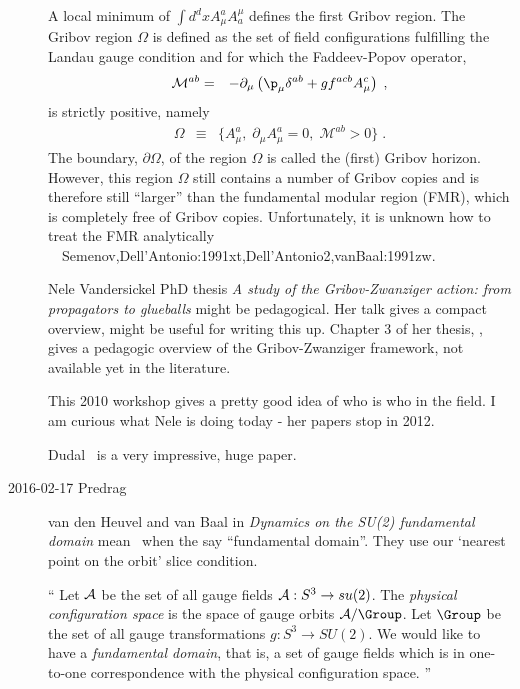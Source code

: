 \begin{description}
A local minimum of $\int d^dx A_\mu^a A^\mu_a$
defines the first Gribov region.
The Gribov region $\Omega$ is  defined as the set of
field configurations fulfilling the Landau gauge condition and for
which the Faddeev-Popov operator,
\begin{eqnarray}
\mathcal{M}^{ab} &=&  -\partial_{\mu}\left( \p_{\mu} \delta^{ab}
    + g f^{acb} A^c_{\mu} \right) \;,
\end{eqnarray}
is strictly positive, namely
\begin{eqnarray}
\Omega &\equiv &\{ A^a_{\mu}, \; \partial_{\mu} A^a_{\mu}=0,
    \; \mathcal{M}^{ab}  >0\} \;.
\end{eqnarray}
The boundary, $\partial \Omega$, of the region $\Omega$ is called the
(first) Gribov horizon. However, this region $\Omega$ still
contains a number of Gribov copies and is therefore still ``larger'' than
the fundamental modular region (FMR), which is completely free of Gribov
copies. Unfortunately, it is unknown how to treat the FMR analytically
~~{Semenov,Dell'Antonio:1991xt,Dell'Antonio2,vanBaal:1991zw}.

Nele Vandersickel PhD thesis {\em A study of the
Gribov-Zwanziger action: from propagators to glueballs} might be
pedagogical. Her
{talk} gives a compact overview, might be useful for writing this up.
Chapter 3 of her thesis, , gives a
pedagogic overview of the Gribov-Zwanziger framework, not available yet
in the literature.

This 2010  {workshop}
gives a pretty good idea of who is who in the field. I am curious what
Nele is doing today - 
{her papers} stop in 2012.

Dudal~\etal{} is a very impressive, huge paper.


\item[2016-02-17  Predrag]
van den Heuvel and van Baal in {\em Dynamics on the {SU(2)}
fundamental domain} mean \slice\ when the say ``fundamental domain''.
They use our `nearest point on the orbit' slice condition.

``
Let ${\cal A}$ be the set of all gauge fields ${\cal A}  : S^3 \to
su(2)$. The \emph{physical configuration space} is the space of gauge
orbits ${\cal A}/\Group$. Let $\Group$ be the set of all gauge
transformations $g : S^3 \to SU(2)$. We would like to have a
\emph{fundamental domain}, that is, a set of gauge fields which is in
one-to-one correspondence with the physical configuration space.
''


\end{description}
